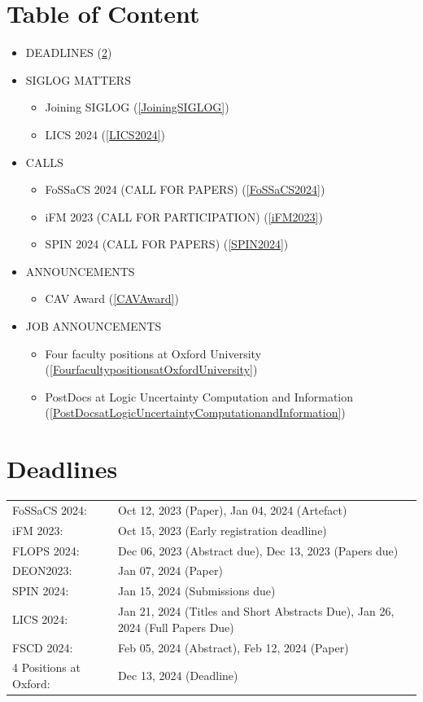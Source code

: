 \documentclass[prodmode,acmtecs]{acmsmall} %
\begin{document}
\section{Table of Content}\begin{itemize}\item DEADLINES (\cref{deadlines}) 
 
\item SIGLOG MATTERS 
 
\begin{itemize}\item Joining SIGLOG (\cref{JoiningSIGLOG})
\item LICS 2024 (\cref{LICS2024})
\end{itemize} 
\item CALLS 
 
\begin{itemize}\item FoSSaCS 2024 (CALL FOR PAPERS) (\cref{FoSSaCS2024})
\item iFM 2023 (CALL FOR PARTICIPATION) (\cref{iFM2023})
\item SPIN 2024 (CALL FOR PAPERS) (\cref{SPIN2024})
\end{itemize} 
\item ANNOUNCEMENTS 
 
\begin{itemize}\item CAV Award (\cref{CAVAward})
\end{itemize} 
\item JOB ANNOUNCEMENTS 
 
\begin{itemize}\item Four faculty positions at Oxford University (\cref{FourfacultypositionsatOxfordUniversity})
\item PostDocs at Logic Uncertainty Computation and Information (\cref{PostDocsatLogicUncertaintyComputationandInformation})
\end{itemize} 
\end{itemize}\section{Deadlines}\label{deadlines}\begin{tabulary}{\linewidth}{LL}FoSSaCS 2024:  & Oct 12, 2023 (Paper), Jan 04, 2024 (Artefact) \\
iFM 2023:  & Oct 15, 2023 (Early registration deadline) \\
FLOPS 2024:  & Dec 06, 2023 (Abstract due), Dec 13, 2023 (Papers due) \\
DEON2023:  & Jan 07, 2024 (Paper) \\
SPIN 2024:  & Jan 15, 2024 (Submissions due) \\
LICS 2024:  & Jan 21, 2024 (Titles and Short Abstracts Due), Jan 26, 2024 (Full Papers Due) \\
FSCD 2024:  & Feb 05, 2024 (Abstract), Feb 12, 2024 (Paper) \\
4 Positions at Oxford:  & Dec 13, 2024 (Deadline) \\
\end{tabulary}
\end{document}
